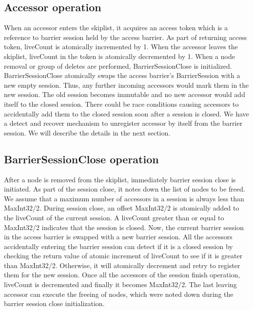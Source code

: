 \documentclass{vldb}
\begin{document}
\subsection{Accessor operation}
When an accessor enters the skiplist, it acquires an access token which is a reference to barrier session held by the access barrier. As part of returning access token, liveCount is atomically incremented by 1. When the accessor leaves the skiplist, liveCount in the token is atomically decremented by 1. When a node removal or group of deletes are performed, BarrierSessionClose is initialized. BarrierSessionClose atomically swaps the access barrier's BarrierSession with a new empty session. Thus, any further incoming accessors would mark them in the new session. The old session becomes immutable and no new accessor would add itself to the closed session. There could be race conditions causing accessors to accidentally add them to the closed session soon after a session is closed. We have a detect and recover mechanism to unregister accessor by itself from the barrier session. We will describe the details in the next section.

\subsection{BarrierSessionClose operation}
After a node is removed from the skiplist, immediately barrier session close is initiated. As part of the session close, it notes down the list of nodes to be freed. We assume that a maximum number of accessors in a session is always less than MaxInt32/2. During session close, an offset MaxInt32/2 is atomically added to the liveCount of the current session. A liveCount greater than or equal to MaxInt32/2 indicates that the session is closed. Now, the current barrier session in the access barrier is swapped with a new barrier session. All the accessors accidentally entering the barrier session can detect if it is a closed session by checking the return value of atomic increment of liveCount to see if it is greater than MaxInt32/2. Otherwise, it will atomically decrement and retry to register them for the new session. Once all the accessors of the session finish operation, liveCount is decremented and finally it becomes MaxInt32/2. The last leaving accessor can execute the freeing of nodes, which were noted down during the barrier session close initialization.
\end{document}
